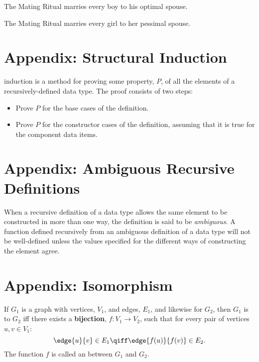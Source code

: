 \documentclass[quiz]{mcs}
\begin{document}
The Mating Ritual marries every boy to his optimal spouse.

The Mating Ritual marries every girl to her pessimal spouse.

\section*{Appendix: Structural Induction}

 induction is a method for proving
some property, $P$, of all the elements of a recursively-defined data
type.  The proof consists of two steps:
\begin{itemize}
\item Prove $P$ for the base cases of the definition. 
\item Prove $P$ for the constructor cases of the definition, assuming that it
  is true for the component data items.  
\end{itemize}

\section*{Appendix: Ambiguous Recursive Definitions}

When a recursive definition of a data type
allows the same element to be constructed in more than one way, the
definition is said to be \emph{ambiguous}.  A function defined recursively
from an ambiguous definition of a data type will not be well-defined
unless the values specified for the different ways of constructing the
element agree.

\section*{Appendix: Isomorphism}

  If $G_1$ is a graph with vertices, $V_1$, and edges, $E_1$, and likewise
  for $G_2$, then $G_1$ is  to $G_2$ iff there exists a
  \textbf{bijection}, $f: V_1 \to V_2$, such that for every pair of
  vertices $u, v \in V_1$:
\[
\edge{u}{v} \in E_1 \qiff \edge{f(u)}{f(v)} \in E_2.
\]
The function $f$ is called an  between $G_1$ and
$G_2$.
\end{document}
